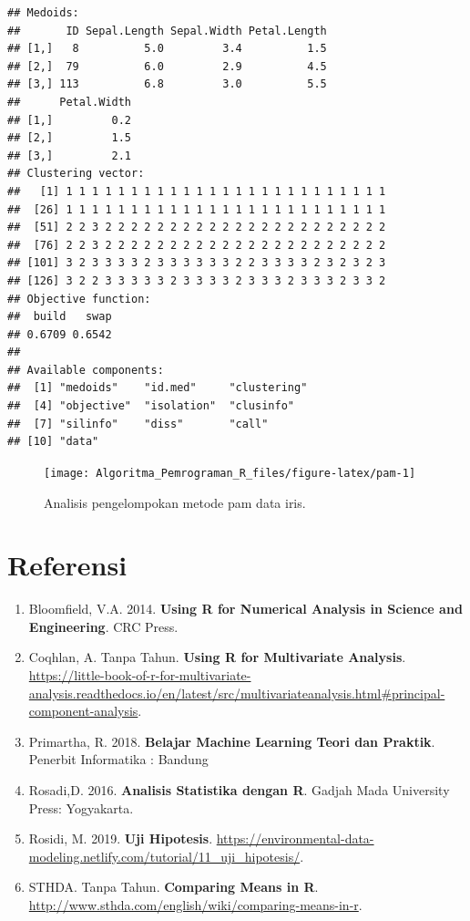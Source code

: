 \documentclass[
]{book}
\providecommand{\tightlist}{%
  \setlength{\itemsep}{0pt}\setlength{\parskip}{0pt}}
\theoremstyle{definition}
\theoremstyle{definition}
\theoremstyle{definition}
\theoremstyle{definition}
\theoremstyle{remark}
\begin{document}
\begin{verbatim}
## Medoids:
##       ID Sepal.Length Sepal.Width Petal.Length
## [1,]   8          5.0         3.4          1.5
## [2,]  79          6.0         2.9          4.5
## [3,] 113          6.8         3.0          5.5
##      Petal.Width
## [1,]         0.2
## [2,]         1.5
## [3,]         2.1
## Clustering vector:
##   [1] 1 1 1 1 1 1 1 1 1 1 1 1 1 1 1 1 1 1 1 1 1 1 1 1 1
##  [26] 1 1 1 1 1 1 1 1 1 1 1 1 1 1 1 1 1 1 1 1 1 1 1 1 1
##  [51] 2 2 3 2 2 2 2 2 2 2 2 2 2 2 2 2 2 2 2 2 2 2 2 2 2
##  [76] 2 2 3 2 2 2 2 2 2 2 2 2 2 2 2 2 2 2 2 2 2 2 2 2 2
## [101] 3 2 3 3 3 3 2 3 3 3 3 3 3 2 2 3 3 3 3 2 3 2 3 2 3
## [126] 3 2 2 3 3 3 3 3 2 3 3 3 3 2 3 3 3 2 3 3 3 2 3 3 2
## Objective function:
##  build   swap 
## 0.6709 0.6542 
## 
## Available components:
##  [1] "medoids"    "id.med"     "clustering"
##  [4] "objective"  "isolation"  "clusinfo"  
##  [7] "silinfo"    "diss"       "call"      
## [10] "data"
\end{verbatim}

\begin{figure}

{\centering \texttt{[image: Algoritma\_Pemrograman\_R\_files/figure-latex/pam-1]} 

}

\caption{Analisis pengelompokan metode pam data iris.}\label{fig:pam}
\end{figure}

\hypertarget{referensi-6}{%
\section{Referensi}\label{referensi-6}}

\begin{enumerate}
\def\labelenumi{\arabic{enumi}.}
\tightlist
\item
  Bloomfield, V.A. 2014. \textbf{Using R for Numerical Analysis in Science and Engineering}. CRC Press.
\item
  Coqhlan, A. Tanpa Tahun. \textbf{Using R for Multivariate Analysis}. \url{https://little-book-of-r-for-multivariate-analysis.readthedocs.io/en/latest/src/multivariateanalysis.html\#principal-component-analysis}.
\item
  Primartha, R. 2018. \textbf{Belajar Machine Learning Teori dan Praktik}. Penerbit Informatika : Bandung
\item
  Rosadi,D. 2016. \textbf{Analisis Statistika dengan R}. Gadjah Mada University Press: Yogyakarta.
\item
  Rosidi, M. 2019. \textbf{Uji Hipotesis}. \url{https://environmental-data-modeling.netlify.com/tutorial/11_uji_hipotesis/}.
\item
  STHDA. Tanpa Tahun. \textbf{Comparing Means in R}. \url{http://www.sthda.com/english/wiki/comparing-means-in-r}.
\end{enumerate}
\end{document}
